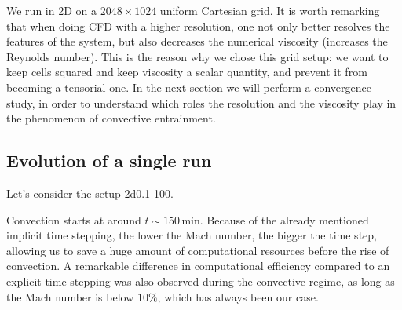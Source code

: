 We run in 2D on a $2048 \times 1024$ uniform Cartesian grid. It is worth remarking that when doing CFD with a higher resolution, one not only better resolves the features of the system, but also decreases the numerical viscosity (increases the Reynolds number). This is the reason why we chose this grid setup: we want to keep cells squared and keep viscosity a scalar quantity, and prevent it from becoming a tensorial one. In the next section we will perform a convergence study, in order to understand which roles the resolution and the viscosity play in the phenomenon of convective entrainment.


\subsection{Evolution of a single run}

Let's consider the setup 2d0.1-100. 

Convection starts at around $t \sim 150 \, \mathrm{min}$. Because of the already mentioned implicit time stepping, the lower the Mach number, the bigger the time step, allowing us to save a huge amount of computational resources before the rise of convection. A remarkable difference in computational efficiency compared to an explicit time stepping was also observed during the convective regime, as long as the Mach number is below $10 \%$, which has always been our case.

